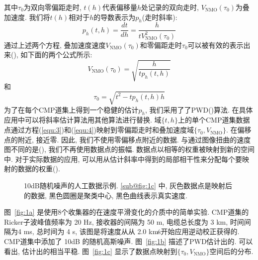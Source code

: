其中$\tau_0$为双向零偏距走时, $t(h)$代表偏移量$h$处记录的双向走时, $V_{\mathrm{NMO}}(\tau_0)$为叠加速度. 我们将$t(h)$相对于$h$的导数表示为$p_h$(走时斜率):
\begin{equation}
    p_{h}(t, h)=\frac{d t}{d h}=\frac{h}{t V_{\mathrm{NMO}}^{2}\left(\tau_{0}\right)}
\end{equation}
通过上述两个方程, 叠加速度速度$V_{\mathrm{NMO}}(\tau_0)$和零偏距走时$\tau_0$可以被有效的表示出来(\cite{Ottolini1983, Fomel2007}), 如下面的两个公式所示: 
\begin{equation}
    V_{\mathrm{NMO}}\left(\tau_{0}\right)=\sqrt{\frac{h}{t p_{h}(t, h)}}
    \label{equ:3}
\end{equation}
和
\begin{equation}
    \tau_{0}=\sqrt{t^{2}-t p_{h}(t, h) h}
    \label{equ:4}
\end{equation}
为了在每个CMP道集上得到一个稳健的估计$p_h$, 我们采用了了PWD(\cite{Fomel2002, Chen2013})算法. 在具体应用中可以将斜率估计算法用其他算法进行替换. 域$\{t,h\}$上的单个CMP道集数据点通过方程(\ref{equ:3})和(\ref{equ:4})映射到零偏距走时和叠加速度域$\{\tau_0,V_{\mathrm{NMO}}\}$. 在偏移点的附近, 接近零. 因此, 我们不使用零偏移点附近的数据. 与通过图像扭曲的速度图不同的是(\cite{Fomel2007}), 我们不再使用数据点的振幅. 数据点以相等的权重被映射到新的空间中. 对于实际数据的应用, 可以用从估计斜率中得到的局部相干性来分配每个要映射的数据的权重(\cite{Zhang2013}). 
\begin{figure}[htb]
    \centering
    \caption{10dB随机噪声的人工数据示例. \ref{sub@fig:1c} 中, 灰色数据点是映射后的数据, 黑色圆圈是聚类中心, 黑色曲线表示真实速度. 
    }
\end{figure}
图~\ref{fig:1a} 是使用8个收集器的在速度平滑变化的介质中的简单实验. CMP道集的Ricker子波峰值频率为 20 Hz, 接收器的间隔为 50 m, 电缆总长度为 3 km, 时间间隔为4 ms, 总时间为 4 s, 该图是将速度从从 2.0 km∕s开始应用逆动校正获得的. CMP道集中添加了 10dB 的随机高斯噪声. 图~\ref{fig:1b} 描述了PWD估计出的. 可以看出, 估计出的相当平稳. 图~\ref{fig:1c} 显示了数据点映射到$\{\tau_0,V_{\mathrm{NMO}}\}$空间后的分布. 

